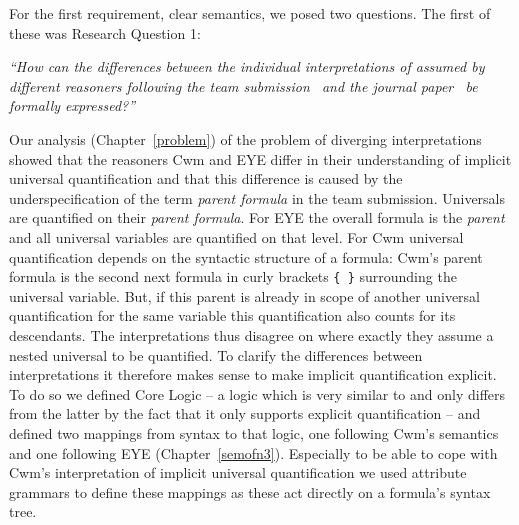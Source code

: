 For the first requirement, clear semantics, we posed two questions. The first of these was Research Question 1:

\emph{``How can the differences between the individual interpretations of \nthree assumed by different reasoners 
following the \wwwc team submission~\cite{Notation3}
and the journal paper~\cite{N3Logic}
 be formally expressed?''} 

Our analysis (Chapter~\ref{problem}) of the problem of diverging interpretations showed that the reasoners Cwm and EYE differ in their understanding of implicit universal quantification 
and that this difference is caused by the underspecification of the term \emph{parent formula} in the \wwwc team submission.
Universals are quantified on their \emph{parent formula}. For EYE the overall formula is the \emph{parent} and all universal variables are quantified on that level. For Cwm 
universal quantification depends on the syntactic structure of a formula: Cwm's parent formula 
is the second next formula in curly brackets
\texttt{\{~\}} surrounding the universal variable. But, if this parent is already in scope of another universal quantification for the same variable this quantification also counts 
for its descendants. %
The interpretations thus disagree on where exactly they assume a nested universal to be quantified. To clarify the differences between interpretations it therefore makes sense to make
implicit quantification explicit. To do so we defined \nthree Core Logic -- a logic which is very similar to \nthree and only differs from the latter by the 
fact that it only supports explicit quantification -- and defined two mappings from \nthree syntax to that logic, one following Cwm's semantics and one following EYE (Chapter~\ref{semofn3}).
Especially to be able to cope with Cwm's interpretation of implicit universal quantification we used attribute grammars to define these mappings as these act directly 
on a formula's syntax tree.
%
% 

